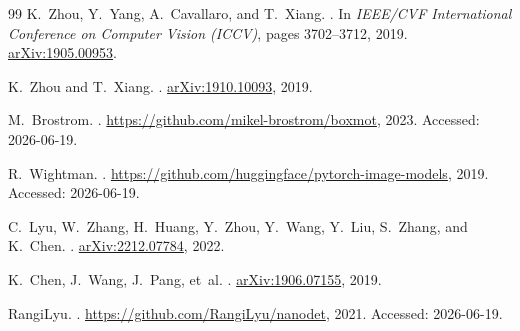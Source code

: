 \documentclass[12pt, a4paper]{article}
\begin{document}
\begin{thebibliography}{99}
K.~Zhou, Y.~Yang, A.~Cavallaro, and T.~Xiang.
.
\newblock In \emph{IEEE/CVF International Conference on Computer Vision (ICCV)}, pages 3702--3712, 2019.
\newblock \href{https://arxiv.org/abs/1905.00953}{arXiv:1905.00953}.

K.~Zhou and T.~Xiang.
.
\newblock \href{https://arxiv.org/abs/1910.10093}{arXiv:1910.10093}, 2019.

M.~Brostrom.
.
\newblock \url{https://github.com/mikel-brostrom/boxmot}, 2023. Accessed: 2026-06-19.

R.~Wightman.
.
\newblock \url{https://github.com/huggingface/pytorch-image-models}, 2019. Accessed: 2026-06-19.

C.~Lyu, W.~Zhang, H.~Huang, Y.~Zhou, Y.~Wang, Y.~Liu, S.~Zhang, and K.~Chen.
.
\newblock \href{https://arxiv.org/abs/2212.07784}{arXiv:2212.07784}, 2022.

K.~Chen, J.~Wang, J.~Pang, et~al.
.
\newblock \href{https://arxiv.org/abs/1906.07155}{arXiv:1906.07155}, 2019.

RangiLyu.
.
\newblock \url{https://github.com/RangiLyu/nanodet}, 2021. Accessed: 2026-06-19.

\end{thebibliography}
\end{document}
